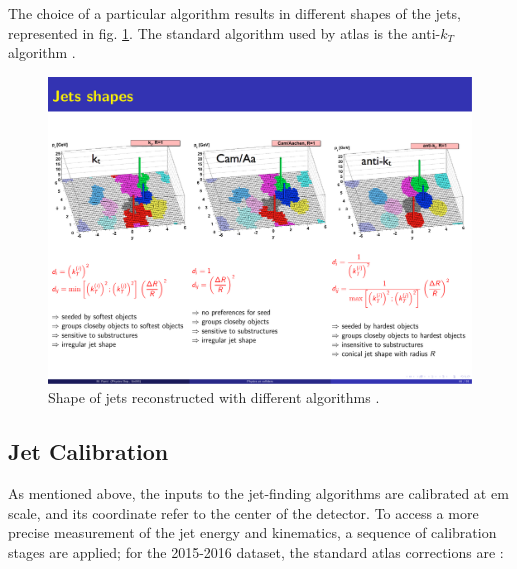 The choice of a particular algorithm results in different shapes of the jets, represented in fig. \ref{fig:jetsalg}. The standard algorithm used by \gls{atlas} is the anti-$k_T$ algorithm \cite{cacciari:antikt}.

\begin{figure}[h]
\includegraphics[width=\textwidth]{./figures/objects/jetsalg.pdf}
\caption[Shape of jets reconstructed with different algorithms]{Shape of jets reconstructed with different algorithms \cite{cacciari:antikt}.}
\label{fig:jetsalg}
\end{figure}

\subsection{Jet Calibration}
\label{sec:obj:jetcalib}

As mentioned above, the inputs to the jet-finding algorithms are calibrated at \gls{em} scale, and its coordinate refer to the center of the detector. To access a more precise measurement of the jet energy and kinematics, a sequence of calibration stages are applied; for the 2015-2016 dataset, the standard \gls{atlas} corrections are \cite{PhysRevD.96.072002}:

